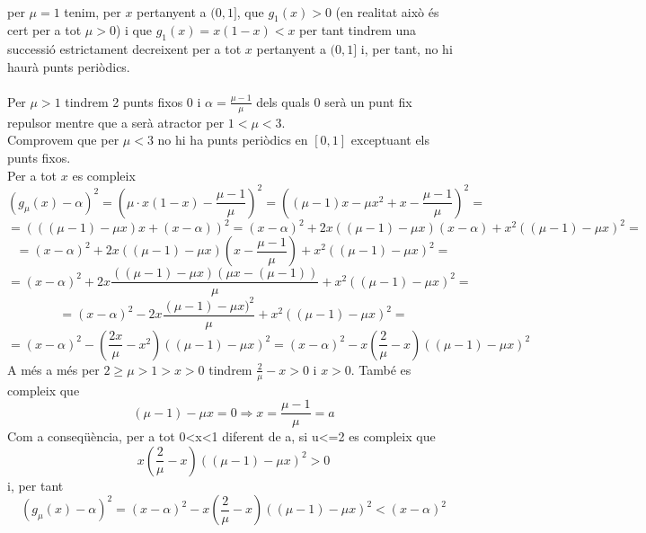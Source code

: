 \documentclass[a4paper,10pt]{article}
\renewcommand{\*}{\cdot}
\renewcommand{\a}{\alpha}
\renewcommand{\u}{\mu}
\begin{document}
\phantom{.}\\
per $\mu=1$ tenim, per $x$ pertanyent a $(0,1]$, que $g_1(x)>0$ (en realitat això és cert per a tot $\mu>0$) i que
$g_1(x)=x(1-x)<x$ per tant tindrem una successió estrictament decreixent per a tot $x$ pertanyent a $(0,1]$ i, per tant, no hi haurà punts periòdics.\\
\phantom{.}\\
Per $\mu>1$ tindrem 2 punts fixos 0 i $\a=\frac{\u-1}{\u}$ dels quals 0 serà un punt fix repulsor mentre que a serà atractor per $1<\u<3$.\\
Comprovem que per $\u<3$ no hi ha punts periòdics en $[0,1]$ exceptuant els punts fixos.\\
Per a tot $x$ es compleix
\begin{equation*}
(g_{\u}(x)-\a)^2=\left(\u\*x(1-x)-\frac{\u-1}{\u}\right)^2=
\left((\u-1)x-\u x^2+x-\frac{\u-1}{\u}\right)^2=
\end{equation*}
\begin{equation*}
=(((\u-1)-\u x)x+(x-\a))^2
=(x-\a)^2+2x((\u-1)-\u x)(x-\a)+x^2((\u-1)-\u x)^2=
\end{equation*}
\begin{equation*}
=(x-\a)^2+2x((\u-1)-\u x)(x-\frac{\u-1}{\u})+x^2((\u-1)-\u x)^2=
\end{equation*}
\begin{equation*}
=(x-\a)^2+2x\frac{((\u-1)-\u x)(\u x-(\u-1))}{\u}+x^2((\u-1)-\u x)^2=
\end{equation*}
\begin{equation*}
=(x-\a)^2-2x\frac{(\u-1)-\u x)^2}{\u}+x^2((\u-1)-\u x)^2=
\end{equation*}
\begin{equation*}
=(x-\a)^2-\left(\frac{2x}{\u}-x^2\right)((\u-1)-\u x)^2=(x-\a)^2-x\left(\frac{2}{\u}-x\right)((\u-1)-\u x)^2
\end{equation*}
A més a més per $2\ge\u>1>x>0$ tindrem $\frac{2}{\u}-x>0$ i $x>0$. També es compleix que
\begin{equation*}
(\u-1)-\u x=0  \Rightarrow x=\frac{\u-1}{\u}=a 
\end{equation*}
Com a conseqüència, per a tot 0<x<1 diferent de a, si u<=2 es compleix que
\begin{equation*}
x\left(\frac{2}{\u}-x\right)((\u-1)-\u x)^2>0
\end{equation*}
i, per tant
\begin{equation*}
(g_{\u}(x)-\a)^2=(x-\a)^2-x\left(\frac{2}{\u}-x\right)((\u-1)-\u x)^2<(x-\a)^2
\end{equation*}
\end{document}
